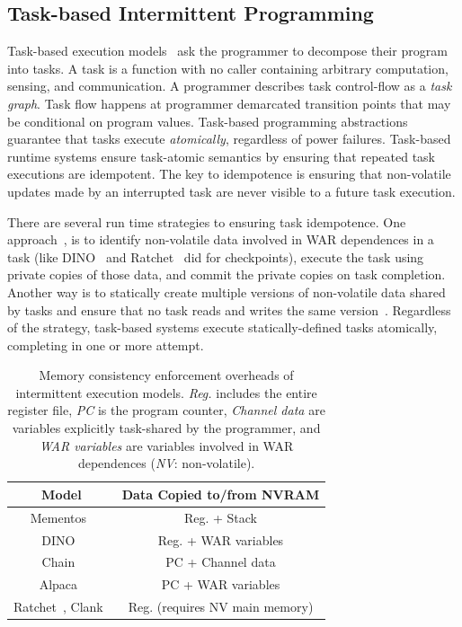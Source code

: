 \subsection{Task-based Intermittent Programming}
\label{section:background_task_computing}

Task-based execution models~\cite{dino,chain,alpaca} ask the programmer to decompose their program into tasks. A task is a function with no caller containing arbitrary computation, sensing, and communication. A programmer describes task control-flow as a {\em task graph}. Task flow happens at programmer demarcated transition points that may be conditional on program values. Task-based programming abstractions guarantee that tasks execute {\em atomically}, regardless of power failures. Task-based runtime systems ensure task-atomic semantics by ensuring that repeated task executions are idempotent. The key to idempotence is ensuring that non-volatile updates made by an interrupted task are never visible to a future task execution.  

There are several run time strategies to ensuring task idempotence. One approach~\cite{alpaca}, is to identify non-volatile data involved in WAR dependences in a task (like DINO~\cite{dino} and Ratchet~\cite{ratchet} did for checkpoints), execute the task using private copies of those data, and commit the private copies on task completion. Another way is to statically create multiple versions of non-volatile data shared by tasks and ensure that no task reads and writes the same version~\cite{chain}. Regardless of the strategy, task-based systems execute statically-defined tasks atomically, completing in one or more attempt. 

\begin{table}
	\centering
	\footnotesize
	\begin{tabular}{|c|c|}
		\hline
		Model & Data Copied to/from NVRAM \\
		\hline\hline
		Mementos~\cite{mementos}                             & Reg. + Stack     \\
		DINO~\cite{dino}                                     & Reg. + WAR variables \\
		Chain~\cite{chain}                                   & PC   + Channel data\\
		Alpaca~\cite{alpaca}                                 & PC   + WAR variables \\
		Ratchet~\cite{ratchet}, Clank~\cite{hicks_isca_2017} & Reg. (requires NV main memory) \\
		\hline
	\end{tabular}
	\caption{Memory consistency enforcement overheads of intermittent execution models. \emph{Reg.} includes the entire register file, \emph{PC} is the program counter, \emph{Channel data} are variables explicitly task-shared by the programmer, and \emph{WAR variables} are variables involved in WAR dependences (\emph{NV}: non-volatile).}
	\label{table:chechpoint_comparison}
\end{table}


